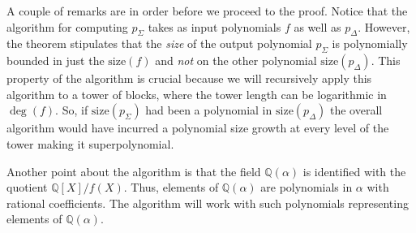 \documentclass[prodmod,acmtalg]{acmsmall}
\newcommand{\size}[1]{{\ensuremath{\mathrm{size}\left(#1\right)}}}
\newcommand{\Q}{\ensuremath{\mathbb{Q}}}
\begin{document}
\begin{remark}
  A couple of remarks are in order before we proceed to the
  proof. Notice that the algorithm for computing $p_\Sigma$ takes as
  input polynomials $f$ as well as $p_\Delta$. However, the theorem
  stipulates that the \emph{size} of the output polynomial $p_\Sigma$
  is polynomially bounded in just the $\size{f}$ and \emph{not} on the
  other polynomial $\size{p_\Delta}$. This property of the algorithm
  is crucial because we will recursively apply this algorithm to a
  tower of blocks, where the tower length can be logarithmic in
  $\deg(f)$. So, if $\size{p_\Sigma}$ had been a polynomial in
  $\size{p_\Delta}$ the overall algorithm would have incurred a
  polynomial size growth at every level of the tower making it
  superpolynomial.

  Another point about the algorithm is that the field $\Q(\alpha)$ is
  identified with the quotient $\Q[X]/f(X)$.  Thus, elements of
  $\Q(\alpha)$ are polynomials in $\alpha$ with rational
  coefficients. The algorithm will work with such polynomials
  representing elements of $\Q(\alpha)$.
\end{remark}
\end{document}
